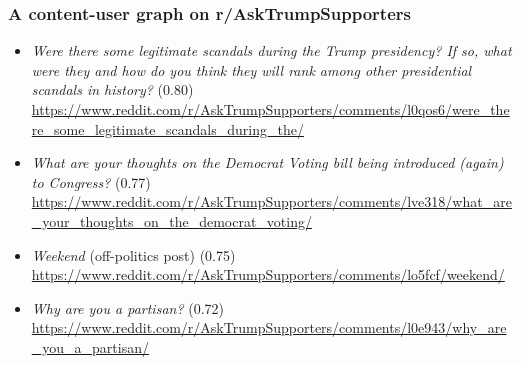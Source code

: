 \documentclass{beamer}
\begin{document}
\begin{frame}[c]
    \frametitle{A content-user graph on r/AskTrumpSupporters}

    \begin{itemize}
        \item \textit{Were there some legitimate scandals during the Trump presidency?
                If so, what were they and how do you think they will rank among
            other presidential scandals in history?} (0.80)
            {\tiny
            \url{https://www.reddit.com/r/AskTrumpSupporters/comments/l0qos6/were_there_some_legitimate_scandals_during_the/}}
        \item \textit{What are your thoughts on the Democrat Voting bill being
            introduced (again) to Congress?} (0.77)
            {\tiny
            \url{https://www.reddit.com/r/AskTrumpSupporters/comments/lve318/what_are_your_thoughts_on_the_democrat_voting/}}
        \item \textit{Weekend} (off-politics post) (0.75)
            {\tiny\url{https://www.reddit.com/r/AskTrumpSupporters/comments/lo5fcf/weekend/}}
        \item  \textit{Why are you a partisan?} (0.72)
            {\tiny\url{https://www.reddit.com/r/AskTrumpSupporters/comments/l0e943/why_are_you_a_partisan/}}
    \end{itemize}

\end{frame}
\end{document}
